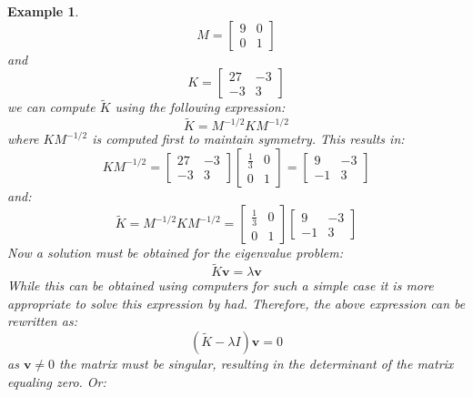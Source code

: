 \documentclass[12pt,letter]{article}
\newtheorem{ex}{Example}
\numberwithin{ex}{section} %
\newenvironment{example}{\begin{mdframed}[middlelinewidth=0.5mm]\begin{ex}\normalfont}{\end{ex}\end{mdframed}}
\numberwithin{re}{section} %
\begin{document}
\begin{example}
\begin{equation}
	M = \begin{bmatrix} 9 & 0 \\  0  & 1 \end{bmatrix} 
\end{equation}
and 
\begin{equation}
	 K = \begin{bmatrix} 27 & -3 \\    -3  & 3 \end{bmatrix}
\end{equation}
we can compute  $\widetilde{K}$ using the following expression:
\begin{equation}
	 \widetilde{K}=M^{-1/2}KM^{-1/2}
\end{equation}
where $KM^{-1/2}$ is computed first to maintain symmetry. This results in:
\begin{equation}
	 KM^{-1/2} =  \begin{bmatrix} 27 & -3 \\    -3  & 3 \end{bmatrix}  \begin{bmatrix} \frac{1}{3} & 0 \\    0  & 1 \end{bmatrix}= \begin{bmatrix} 9 & -3 \\    -1  & 3 \end{bmatrix}
\end{equation}
and:
\begin{equation}
	  \widetilde{K}=M^{-1/2}KM^{-1/2} =  \begin{bmatrix} \frac{1}{3} & 0 \\    0  & 1 \end{bmatrix} \begin{bmatrix} 9 & -3 \\    -1  & 3 \end{bmatrix}
\end{equation}
Now a solution must be obtained for the eigenvalue problem:
\begin{equation}
\widetilde{K}\textbf{v} =  \lambda \textbf{v}
\end{equation}
While this can be obtained using computers for such a simple case it is more appropriate to solve this expression by had. Therefore, the above expression can be rewritten as:
\begin{equation}
(\widetilde{K} - \lambda I)\textbf{v} =  0
\end{equation}
as $\textbf{v} \neq 0$ the matrix must be singular, resulting in the determinant of the matrix equaling zero. Or:

\end{example}
\end{document}
